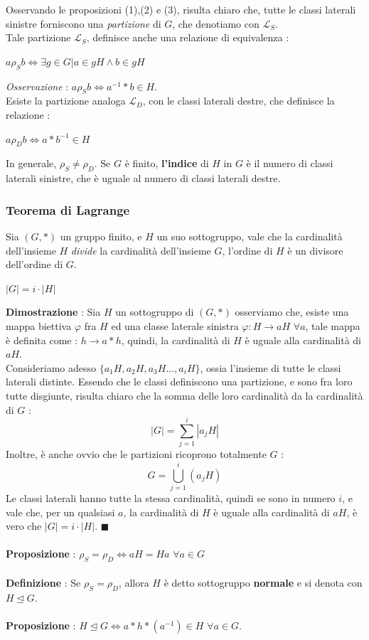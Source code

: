 \documentclass[12pt, letterpaper]{article}
\begin{document}
Osservando le proposizioni (1),(2) e (3), risulta chiaro che, tutte le classi laterali sinistre  
forniscono una \textit{partizione} di \(G\), che denotiamo con \(\mathcal{L}_S\).\\
Tale partizione \(\mathcal{L}_S\), definisce anche una relazione di equivalenza : \begin{center}
    \(a\rho_S b\iff \exists g\in G |a\in gH \land b\in gH\)
\end{center}
\textit{Osservazione }:  \(a\rho_S b\iff a^{-1}*b\in H\). 
\\Esiste la partizione analoga \(\mathcal{L}_D\), con le classi laterali destre, che definisce la relazione :
\begin{center}
    \(a\rho_D b\iff a*b^{-1}\in H\)
\end{center}
In generale, \(\rho_S\ne \rho_D\).
Se \(G\) è finito, \textbf{l'indice} di \(H\) in \(G\) è il numero di classi laterali sinistre, che è uguale 
al numero di classi laterali destre.
\subsubsection{Teorema di Lagrange}
Sia \((G,*)\) un gruppo finito, e \(H\) un suo sottogruppo, vale che la cardinalità dell'insieme \(H\) \textit{divide}
la cardinalità dell'insieme \(G\), l'ordine di \(H\) è un divisore dell'ordine di \(G\).\begin{center}
    \(|G|=i\cdot|H|\)
\end{center} 
\textbf{Dimostrazione }: Sia \(H\) un sottogruppo di \((G,*)\) osserviamo che, esiste una mappa biettiva \(\varphi\) 
fra \(H\) ed una classe laterale sinistra \(\varphi:H\rightarrow aH\) \(\forall a\), tale mappa è definita 
come : \(h\rightarrow a*h\), quindi, la cardinalità di \(H\) è uguale alla cardinalità di \(aH\).
\\Consideriamo adesso \(\{a_1H,a_2H,a_3H...,a_iH\}\), ossia l'insieme di tutte le classi 
laterali distinte. Essendo che le classi definiscono una partizione, e sono fra loro tutte disgiunte, 
risulta chiaro che la somma delle loro cardinalità da la cardinalità di \(G\) : \begin{equation}
    |G|=\sum_{j=1}^i|a_jH|
\end{equation}
Inoltre, è anche ovvio che le partizioni ricoprono totalmente \(G\) :
\begin{equation}
    G=\bigcup_{j=1}^i (a_jH)
\end{equation}
Le classi laterali hanno tutte la stessa cardinalità, quindi se sono in numero \(i\), e vale che, per un 
qualsiasi \(a\), la cardinalità di \(H\) è uguale alla cardinalità di \(aH\), è vero che \(|G|=i\cdot|H|\). \(\blacksquare\)
\\\hphantom{}\\
\textbf{Proposizione }: \(\rho_S=\rho_D \iff aH=Ha\)  \(\forall a\in G\)
\\\hphantom{}\\
\textbf{Definizione }: Se \(\rho_S=\rho_D\), allora \(H\) è detto sottogruppo \textbf{normale} e si denota con \(H\unlhd G\).
\\\hphantom{}\\
\textbf{Proposizione }: \(H\unlhd G\iff a*h*(a^{-1})\in H \)  \(\forall a\in G\).
\end{document}
